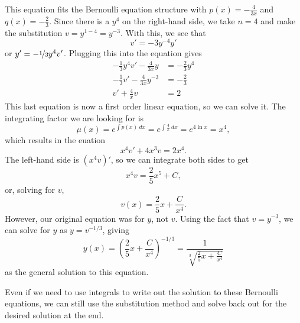 \documentclass{ximera}
\begin{document}
\begin{exampleSol}
    This equation fits the Bernoulli equation structure with $p(x) = -\frac{4}{3x}$ and $q(x) = -\frac{2}{3}$. Since there is a $y^4$ on the right-hand side, we take $n=4$ and make the substitution $v = y^{1-4} = y^{-3}$. With this, we see that
    \begin{equation*}
        v' = -3 y^{-4} y'
    \end{equation*}
    or $y' = -\nicefrac{1}{3}y^4 v'$. Plugging this into the equation gives
    \begin{equation*}
        \begin{split}
            -\frac{1}{3} y^4 v' - \frac{4}{3x}y &= -\frac{2}{3}y^4 \\
            -\frac{1}{3} v' - \frac{4}{3x} y^{-3} &= -\frac{2}{3} \\
            v' + \frac{4}{x} v &= 2
        \end{split}
    \end{equation*}
    This last equation is now a first order linear equation, so we can solve it. The integrating factor we are looking for is 
    \begin{equation*}
        \mu(x) = e^{\int p(x)\ dx} = e^{\int \frac{4}{x}\ dx} = e^{4\ln{x}} = x^4, 
    \end{equation*}
    which results in the euation
    \begin{equation*}
        x^4 v' + 4x^3 v = 2x^4.
    \end{equation*}
    The left-hand side is $(x^4v)'$, so we can integrate both sides to get
    \begin{equation*}
        x^4 v = \frac{2}{5}x^5 + C,
    \end{equation*}
    or, solving for $v$, 
    \begin{equation*}
        v(x) = \frac{2}{5} x + \frac{C}{x^4}.
    \end{equation*}
    However, our original equation was for $y$, not $v$. Using the fact that $v = y^{-3}$, we can solve for $y$ as $y = v^{-1/3}$, giving
    \begin{equation*}
        y(x) = \left(\frac{2}{5}x + \frac{C}{x^4}\right)^{-1/3} = \frac{1}{\sqrt[3]{\frac{2}{5}x + \frac{C}{x^4}}}
    \end{equation*}
    as the general solution to this equation. 
\end{exampleSol}

Even if we need to use integrals to write out the solution to these Bernoulli equations, we can still use the substitution method and solve back out for the desired solution at the end.
\end{document}

